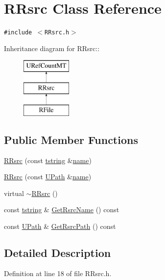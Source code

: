 \hypertarget{class_r_rsrc}{
\section{RRsrc Class Reference}
\label{class_r_rsrc}
}
{\tt \#include $<$RRsrc.h$>$}

Inheritance diagram for RRsrc::\begin{figure}[H]
\begin{center}
\leavevmode
\includegraphics[height=3cm]{class_r_rsrc}
\end{center}
\end{figure}
\subsection*{Public Member Functions}
\begin{CompactItemize}
\item 
\hyperlink{class_r_rsrc_3fa33990b894aa8145499a2c9b801282}{RRsrc} (const \hyperlink{common__afx_8h_816fa58fd77499b0edb2c69ebe803d5c}{tstring} \&\hyperlink{glext__bak_8h_bb62efe59ccdd153ce42e1a418352209}{name})
\item 
\hyperlink{class_r_rsrc_fd183bc1b0b19f06d8036c2621fb4a33}{RRsrc} (const \hyperlink{class_u_path}{UPath} \&\hyperlink{glext__bak_8h_bb62efe59ccdd153ce42e1a418352209}{name})
\item 
virtual \hyperlink{class_r_rsrc_537cb51287dd0d08bea8632f07313c38}{$\sim$RRsrc} ()
\item 
const \hyperlink{common__afx_8h_816fa58fd77499b0edb2c69ebe803d5c}{tstring} \& \hyperlink{class_r_rsrc_b380ec859468787943682d0f1113f2d8}{GetRsrcName} () const 
\item 
const \hyperlink{class_u_path}{UPath} \& \hyperlink{class_r_rsrc_f32b294a2318f9011ef946dd9142c52f}{GetRsrcPath} () const 
\end{CompactItemize}


\subsection{Detailed Description}


Definition at line 18 of file RRsrc.h.

